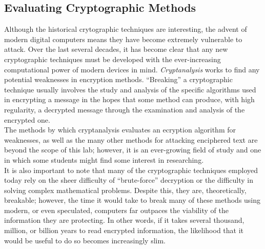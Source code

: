 		\subsection{Evaluating Cryptographic Methods}
			Although the historical crytographic techniques are interesting, the advent of modern digital computers means they have become extremely vulnerable to attack. Over the last several decades, it has become clear that any new cryptographic techniques must be developed with the ever-increasing computational power of modern devices in mind. \emph{Cryptanalysis} works to find any potential weaknesses in encryption methods. ``Breaking'' a cryptographic technique usually involves the study and analysis of the specific algorithms used in encrypting a message in the hopes that some method can produce, with high regularity, a decrypted message through the examination and analysis of the encrypted one.\\[\baselineskip]
			The methods by which cryptanalysis evaluates an ecryption algorithm for weaknesses, as well as the many other methods for attacking enciphered text are beyond the scope of this lab; however, it is an ever-growing field of study and one in which some students might find some interest in researching.\\[\baselineskip]
			It is also important to note that many of the cryptographic techniques employed today rely on the sheer difficulty of ``brute-force'' decryption or the difficulty in solving complex mathematical problems. Despite this, they are, theoretically, breakable; however, the time it would take to break many of these methods using modern, or even speculated, computers far outpaces the viability of the information they are protecting. In other words, if it takes several thousand, million, or billion years to read encrypted information, the likelihood that it would be useful to do so becomes increasingly slim.

	\pagebreak

